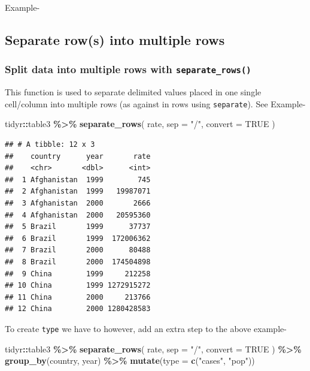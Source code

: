 \documentclass[
]{book}
\newenvironment{Shaded}{\begin{snugshade}}{\end{snugshade}}
\newcommand{\AttributeTok}[1]{\textcolor[rgb]{0.13,0.29,0.53}{#1}}
\newcommand{\ConstantTok}[1]{\textcolor[rgb]{0.56,0.35,0.01}{#1}}
\newcommand{\FunctionTok}[1]{\textcolor[rgb]{0.13,0.29,0.53}{\textbf{#1}}}
\newcommand{\NormalTok}[1]{#1}
\newcommand{\SpecialCharTok}[1]{\textcolor[rgb]{0.81,0.36,0.00}{\textbf{#1}}}
\newcommand{\StringTok}[1]{\textcolor[rgb]{0.31,0.60,0.02}{#1}}
\begin{document}
Example-

\hypertarget{separate-rows-into-multiple-rows}{%
\subsection{Separate row(s) into multiple rows}\label{separate-rows-into-multiple-rows}}

\hypertarget{split-data-into-multiple-rows-with-separate_rows}{%
\subsubsection*{\texorpdfstring{Split data into multiple rows with \texttt{separate\_rows()}}{Split data into multiple rows with separate\_rows()}}\label{split-data-into-multiple-rows-with-separate_rows}}

This function is used to separate delimited values placed in one single cell/column into multiple rows (as against in rows using \texttt{separate}).
See Example-

\begin{Shaded}
\begin{Highlighting}[]
\NormalTok{tidyr}\SpecialCharTok{::}\NormalTok{table3 }\SpecialCharTok{\%\textgreater{}\%} 
  \FunctionTok{separate\_rows}\NormalTok{(}
\NormalTok{    rate,}
    \AttributeTok{sep =} \StringTok{"/"}\NormalTok{,}
    \AttributeTok{convert =} \ConstantTok{TRUE}
\NormalTok{  )}
\end{Highlighting}
\end{Shaded}

\begin{verbatim}
## # A tibble: 12 x 3
##    country      year       rate
##    <chr>       <dbl>      <int>
##  1 Afghanistan  1999        745
##  2 Afghanistan  1999   19987071
##  3 Afghanistan  2000       2666
##  4 Afghanistan  2000   20595360
##  5 Brazil       1999      37737
##  6 Brazil       1999  172006362
##  7 Brazil       2000      80488
##  8 Brazil       2000  174504898
##  9 China        1999     212258
## 10 China        1999 1272915272
## 11 China        2000     213766
## 12 China        2000 1280428583
\end{verbatim}

To create \texttt{type} we have to however, add an extra step to the above example-

\begin{Shaded}
\begin{Highlighting}[]
\NormalTok{tidyr}\SpecialCharTok{::}\NormalTok{table3 }\SpecialCharTok{\%\textgreater{}\%} 
  \FunctionTok{separate\_rows}\NormalTok{(}
\NormalTok{    rate,}
    \AttributeTok{sep =} \StringTok{"/"}\NormalTok{,}
    \AttributeTok{convert =} \ConstantTok{TRUE}
\NormalTok{  ) }\SpecialCharTok{\%\textgreater{}\%} 
  \FunctionTok{group\_by}\NormalTok{(country, year) }\SpecialCharTok{\%\textgreater{}\%} 
  \FunctionTok{mutate}\NormalTok{(}\AttributeTok{type =} \FunctionTok{c}\NormalTok{(}\StringTok{"cases"}\NormalTok{, }\StringTok{"pop"}\NormalTok{))}
\end{Highlighting}
\end{Shaded}
\end{document}
